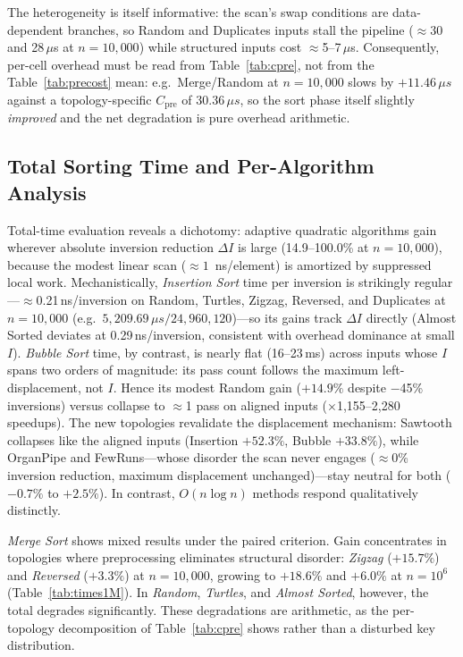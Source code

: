 \documentclass[namedate,webpdf,contemporary,large]{TBench-template}%
\theoremstyle{thmstyleone}%
\theoremstyle{thmstyletwo}%
\theoremstyle{thmstylethree}%
\begin{document}
The heterogeneity is itself informative: the scan's swap conditions are data-dependent branches, so Random and Duplicates inputs stall the pipeline ($\approx$30 and 28\,$\mu$s at $n{=}10{,}000$) while structured inputs cost $\approx$5--7\,$\mu$s. Consequently, per-cell overhead must be read from Table~\ref{tab:cpre}, not from the Table~\ref{tab:precost} mean: e.g.\ Merge/Random at $n{=}10{,}000$ slows by $+11.46\,\mu s$ against a topology-specific $C_{\text{pre}}$ of $30.36\,\mu s$, so the sort phase itself slightly \emph{improved} and the net degradation is pure overhead arithmetic.

\subsection{Total Sorting Time and Per-Algorithm Analysis}
Total-time evaluation reveals a dichotomy: adaptive quadratic algorithms gain wherever absolute inversion reduction $\Delta I$ is large (14.9--100.0\% at $n{=}10{,}000$), because the modest linear scan ($\approx 1$~ns/element) is amortized by suppressed local work. Mechanistically, \emph{Insertion Sort} time per inversion is strikingly regular---$\approx$0.21\,ns/inversion on Random, Turtles, Zigzag, Reversed, and Duplicates at $n{=}10{,}000$ (e.g.\ $5{,}209.69\,\mu s/24{,}960{,}120$)---so its gains track $\Delta I$ directly (Almost Sorted deviates at 0.29\,ns/inversion, consistent with overhead dominance at small $I$). \emph{Bubble Sort} time, by contrast, is nearly flat (16--23\,ms) across inputs whose $I$ spans two orders of magnitude: its pass count follows the maximum left-displacement, not $I$. Hence its modest Random gain ($+14.9\%$ despite $-$45\% inversions) versus collapse to $\approx$1 pass on aligned inputs ($\times$1,155--2,280 speedups). The new topologies revalidate the displacement mechanism: Sawtooth collapses like the aligned inputs (Insertion $+52.3\%$, Bubble $+33.8\%$), while OrganPipe and FewRuns---whose disorder the scan never engages ($\approx$0\% inversion reduction, maximum displacement unchanged)---stay neutral for both ($-0.7\%$ to $+2.5\%$). In contrast, $O(n\log n)$ methods respond qualitatively distinctly.

\emph{Merge Sort} shows mixed results under the paired criterion. Gain concentrates in topologies where preprocessing eliminates structural disorder: \emph{Zigzag} ($+15.7\%$) and \emph{Reversed} ($+3.3\%$) at $n=10{,}000$, growing to $+18.6\%$ and $+6.0\%$ at $n{=}10^6$ (Table~\ref{tab:times1M}). In \emph{Random}, \emph{Turtles}, and \emph{Almost Sorted}, however, the total degrades significantly. These degradations are arithmetic, as the per-topology decomposition of Table~\ref{tab:cpre} shows rather than a disturbed key distribution.
\end{document}
